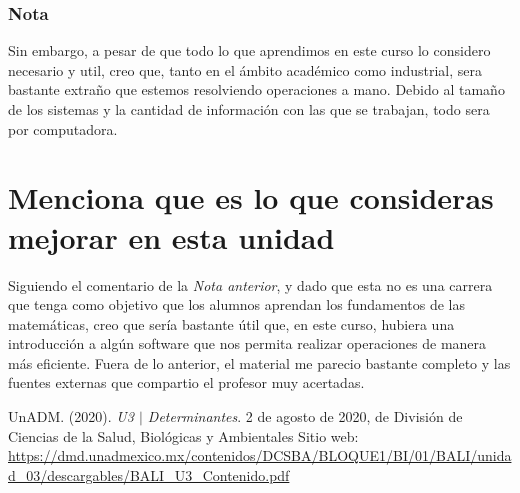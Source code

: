 \documentclass[12pt]{article}
\begin{document}
\subsubsection*{Nota}
	\par Sin embargo, a pesar de que todo lo que aprendimos en este curso lo considero necesario y util, creo que, tanto en el ámbito académico como industrial, sera bastante extraño que estemos resolviendo operaciones a mano. Debido al tamaño de los sistemas y la cantidad de información con las que se trabajan, todo sera por computadora.
	
\section{Menciona que es lo que consideras mejorar en esta unidad}

	\par Siguiendo el comentario de la \textit{Nota anterior}, y dado que esta no es una carrera que tenga como objetivo que los alumnos aprendan los fundamentos de las matemáticas, creo que sería bastante útil que, en este curso, hubiera una introducción a algún software que nos permita realizar operaciones de manera más eficiente. Fuera de lo anterior, el material \cite{biblio} me parecio bastante completo y las fuentes externas que compartio el profesor muy acertadas.



\noindent\makebox[\linewidth]{\rule{\paperwidth}{0.4pt}}
\begin{thebibliography}{X}
	 UnADM. (2020). \textit{U3 $|$ Determinantes}. 2 de agosto de 2020, de División de Ciencias de la Salud, Biológicas y Ambientales Sitio web: \url{https://dmd.unadmexico.mx/contenidos/DCSBA/BLOQUE1/BI/01/BALI/unidad_03/descargables/BALI_U3_Contenido.pdf}

\end{thebibliography}
\end{document}

